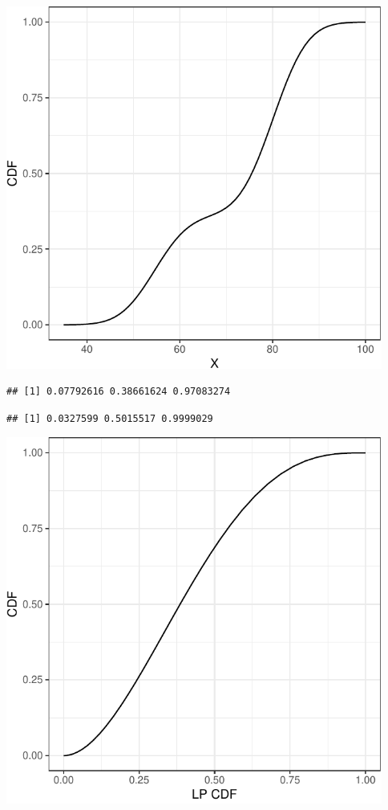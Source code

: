 \documentclass[
]{article}
\begin{document}
\includegraphics[width=468px]{plot_calibration_files/figure-latex/t2-1}

\begin{verbatim}
## [1] 0.07792616 0.38661624 0.97083274
\end{verbatim}

\begin{verbatim}
## [1] 0.0327599 0.5015517 0.9999029
\end{verbatim}

\includegraphics[width=468px]{plot_calibration_files/figure-latex/t3-1}
\end{document}
